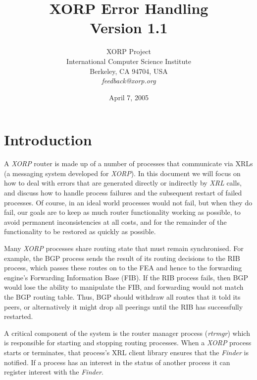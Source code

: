 \documentclass[11pt]{article}
\makeatletter
\newcommand{\xorp} {{\em XORP}\@\xspace}
\newcommand{\finder} {{\em Finder}\@\xspace}
\newcommand{\xrl} {{\em XRL}\@\xspace}
\newcommand{\rtrmgr} {{\em rtrmgr}\@\xspace}
\makeatother
\begin{document}
\title{XORP Error Handling \\
\vspace{1ex}
Version 1.1}
\author{ XORP Project					\\
	 International Computer Science Institute	\\
	 Berkeley, CA 94704, USA			\\
	 {\it feedback@xorp.org}
}
\date{April 7, 2005}

\maketitle

\thispagestyle{empty}


\section{Introduction}

A \xorp router is made up of a number of processes that communicate
via XRLs \cite{xorp:xrl} (a messaging system developed for \xorp). In
this document we will focus on how to deal with errors that are
generated directly or indirectly by \xrl calls, and discuss how to
handle process failures and the subsequent restart of failed
processes.  Of course, in an ideal world processes would not fail, but
when they do fail, our goals are to keep as much router
functionality working as possible, to avoid permanent inconsistencies
at all costs, and for the remainder of the functionality to be
restored as quickly as possible.

Many \xorp processes share routing state that must remain
synchronised. For example, the BGP process sends the result of its
routing decisions to the RIB process, which passes these routes on to
the FEA and hence to the forwarding engine's Forwarding Information
Base (FIB). If the RIB process fails, then BGP would lose the ability
to manipulate the FIB, and forwarding would not match the BGP routing
table.  Thus, BGP should withdraw all routes that it told its peers, or
alternatively it might drop all peerings until the RIB has
successfully restarted.

A critical component of the system is the router manager process
(\rtrmgr) which is responsible for starting and stopping routing
processes. When a \xorp process starts or terminates, that
process's XRL client library ensures that the \finder is notified. If
a process has an interest in the status of another process it can
register interest with the \finder.
\end{document}
